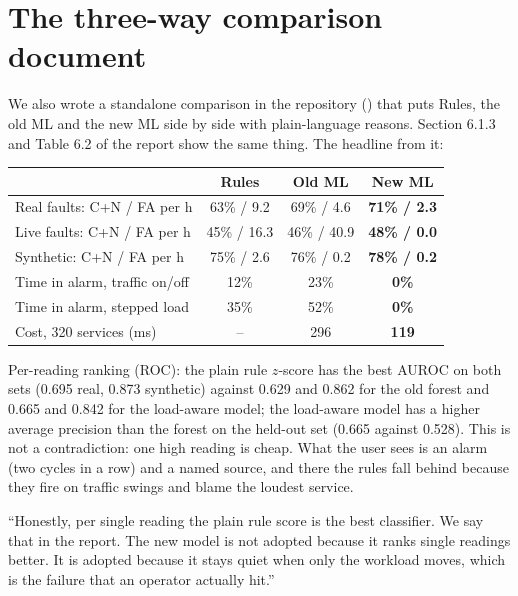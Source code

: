 \section{The three-way comparison document}
We also wrote a standalone comparison in the repository () that puts Rules, the old ML and the new ML side by side with plain-language reasons. Section 6.1.3 and Table 6.2 of the report show the same thing. The headline from it:

\begin{center}
\small
\begin{tabular}{lccc}
\toprule
 & Rules & Old ML & New ML\\
\midrule
Real faults: C+N / FA per h & 63\% / 9.2 & 69\% / 4.6 & \textbf{71\% / 2.3}\\
Live faults: C+N / FA per h & 45\% / 16.3 & 46\% / 40.9 & \textbf{48\% / 0.0}\\
Synthetic: C+N / FA per h & 75\% / 2.6 & 76\% / 0.2 & \textbf{78\% / 0.2}\\
Time in alarm, traffic on/off & 12\% & 23\% & \textbf{0\%}\\
Time in alarm, stepped load & 35\% & 52\% & \textbf{0\%}\\
Cost, 320 services (ms) & -- & 296 & \textbf{119}\\
\bottomrule
\end{tabular}
\end{center}

\begin{techbox}
Per-reading ranking (ROC): the plain rule $z$-score has the best AUROC on both sets (0.695 real, 0.873 synthetic) against 0.629 and 0.862 for the old forest and 0.665 and 0.842 for the load-aware model; the load-aware model has a higher average precision than the forest on the held-out set (0.665 against 0.528). This is not a contradiction: one high reading is cheap. What the user sees is an alarm (two cycles in a row) and a named source, and there the rules fall behind because they fire on traffic swings and blame the loudest service.
\end{techbox}

\begin{saybox}
``Honestly, per single reading the plain rule score is the best classifier. We say that in the report. The new model is not adopted because it ranks single readings better. It is adopted because it stays quiet when only the workload moves, which is the failure that an operator actually hit.''
\end{saybox}
